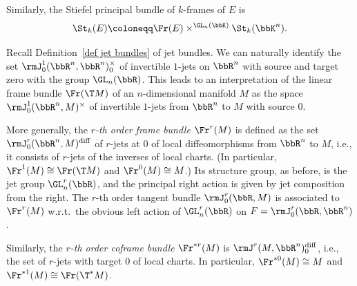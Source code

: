 \begin{example}
\begin{enumerate}
        Similarly, the Stiefel principal bundle of $k$-frames of $E$ is
        \[\St_k(E)\coloneqq \Fr(E)\times^{\GL_n(\bbK)}\St_k(\bbK^n).\]
    \end{enumerate}
\end{example}

\begin{example}\label{ex r-th frame bundle}
    Recall Definition~\ref{def jet bundles} of jet bundles. We can naturally identify the set $\rmJ^1_0(\bbR^n,\bbR^n)_0^\times$ of invertible $1$-jets on $\bbR^n$ with source and target zero with the group $\GL_n(\bbR)$. This leads to an interpretation of the linear frame bundle $\Fr(\T M)$ of an $n$-dimensional manifold $M$ as the space $\rmJ^1_0(\bbR^n,M)^\times$ of invertible $1$-jets from $\bbR^n$ to $M$ with source $0$.

    More generally, the \emph{$r$-th order frame bundle} $\Fr^r(M)$ is defined as the set $\rmJ^r_0(\bbR^n,M)^{\mathrm{diff}}$ of $r$-jets at $0$ of local diffeomorphisms from $\bbR^n$ to $M$, i.e., it consists of $r$-jets of the inverses of local charts. (In particular, $\Fr^1(M)\cong \Fr(\T M)$ and $\Fr^0(M)\cong M$.) Its structure group, as before, is the jet group $\GL^r_n(\bbR)$, and the principal right action is given by jet composition from the right. The $r$-th order tangent bundle $\rmJ^r_0(\bbR,M)$ is associated to $\Fr^r(M)$ w.r.t.\ the obvious left action of $\GL^r_n(\bbR)$ on $F=\rmJ^r_0(\bbR,\bbR^n)$.

    Similarly, the \emph{$r$-th order coframe bundle} $\Fr^{\ast r}(M)$ is $\rmJ^r(M,\bbR^n)_0^{\mathrm{diff}}$, i.e., the set of $r$-jets with target $0$ of local charts. In particular, $\Fr^{\ast 0}(M)\cong M$ and $\Fr^{\ast 1}(M)\cong\Fr(\T^\ast M)$.
\end{example}


